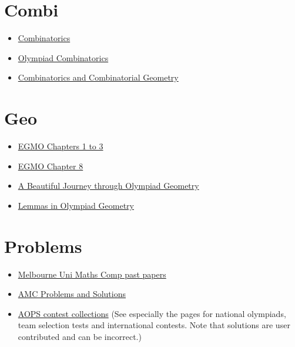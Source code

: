 \section{Combi}
\begin{itemize}
  \item \href{http://math.sun.ac.za/swagner/Combinatorics.pdf}{Combinatorics}
  \item
    \href{https://drive.google.com/file/d/1sQtirXxkEfWYuGSKDZ-d7VGYkR_idebY/view}
    {Olympiad Combinatorics}
  \item
    \href{https://drive.google.com/file/d/1pkgUjWs4ArL9Huq712NO1RtuAvXjr3d9/view?usp=sharing}
    {Combinatorics and Combinatorial Geometry}
\end{itemize}

\section{Geo}
\begin{itemize}
  \item
    \href{https://books.google.com/books?id=47UaDAAAQBAJ&lpg=PP1&pg=PP1#v=onepage&q&f=false}
    {EGMO Chapters 1 to 3}
  \item
    \href{https://www.maa.org/sites/default/files/pdf/ebooks/pdf/EGMO_chapter8.pdf}
    {EGMO Chapter 8}
  \item \href{https://www.olympiadgeometry.com/the-book.html} {A Beautiful
      Journey through Olympiad Geometry}
  \item \href{https://yufeizhao.com/olympiad/geolemmas.pdf} {Lemmas in Olympiad
      Geometry}
\end{itemize}

\section{Problems}
\begin{itemize}
  \item \href{https://mathscomp.ms.unimelb.edu.au/past-papers/} {Melbourne Uni
      Maths Comp past papers}
    \item
      \href{https://artofproblemsolving.com/wiki/index.php/AMC_Problems_and_Solutions}{AMC
      Problems and Solutions}
  \item 
    \href{https://artofproblemsolving.com/community/c13}
    {AOPS contest collections} (See especially the pages for national olympiads,
    team selection tests and international contests. Note that solutions are
    user contributed and can be incorrect.)
\end{itemize}

